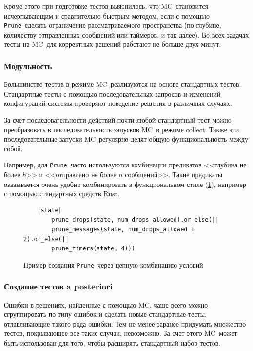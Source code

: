 \documentclass[a4paper,12pt]{extarticle}
\newcommand{\prune}[0]{\texttt{Prune}}
\newcommand{\mc}[0]{MC}
\begin{document}
Кроме этого при подготовке тестов выяснилось, что \mc\ становится исчерпывающим и сравнительно быстрым методом, если с помощью \prune\ сделать ограничение рассматриваемого пространства (по глубине, количеству отправленных сообщений или таймеров, и так далее).
Во всех задачах тесты на \mc\ для корректных решений работают не больше двух минут.

\subsubsection{Модульность}


Большинство тестов в режиме \mc\ реализуются на основе стандартных тестов.
Стандартные тесты с помощью последовательных запросов и изменений конфигураций системы проверяют поведение решения в различных случаях.

За счет последовательности действий почти любой стандартный тест можно преобразовать в последовательность запусков \mc\ в режиме collect.
Также эти последовательные запуски \mc\ регулярно делят общую функциональность между собой.

Например, для \prune\ часто используются комбинации предикатов <<глубина не более $h$>> и <<отправлено не более $n$ сообщений>>.
Такие предикаты оказывается очень удобно комбинировать в функциональном стиле (\cref{listing1}), например с помощью стандартных средств Rust.

\begin{figure}
    \begin{lstlisting}
    |state| 
        prune_drops(state, num_drops_allowed).or_else(||
        prune_messages(state, num_drops_allowed + 2).or_else(||
        prune_timers(state, 4)))
    \end{lstlisting}
    \caption{Пример создания \prune\ через цепную комбинацию условий}
    \label{listing1}
\end{figure}
    
\subsubsection{Создание тестов a posteriori}
\label{posteriori}

Ошибки в решениях, найденные с помощью \mc, чаще всего можно сгруппировать по типу ошибок и сделать новые стандартные тесты, отлавливающие такого рода ошибки.
Тем не менее заранее придумать множество тестов, покрывающее все такие случаи, невозможно.
За счет этого \mc\ может быть использован для того, чтобы расширять стандартный набор тестов.
\end{document}
